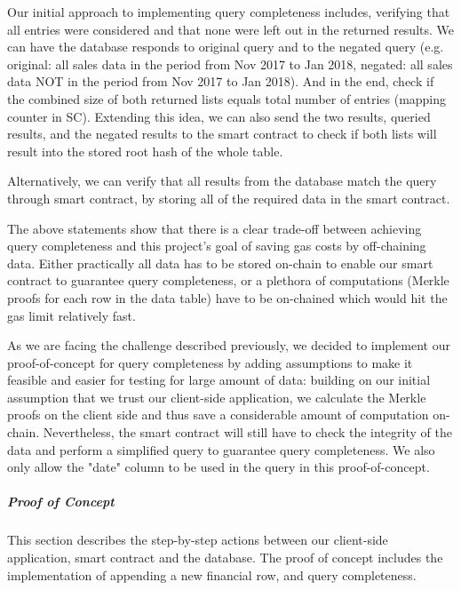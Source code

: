 Our initial approach to implementing query completeness includes, verifying that all entries were considered and that none were left out in the returned results. We can have the database responds to original query and to the negated query (e.g. original: all sales data in the period from Nov 2017 to Jan 2018, negated: all sales data NOT in the period from Nov 2017 to Jan 2018). And in the end, check if the combined size of both returned lists equals total number of entries (mapping counter in SC). Extending this idea, we can also send the two results, queried results, and the negated results to the smart contract to check if both lists will result into the stored root hash of the whole table.

Alternatively, we can verify that all results from the database match the query through smart contract, by storing all of the required data in the smart contract.

The above statements show that there is a clear trade-off between achieving query completeness and this project’s goal of saving gas costs by off-chaining data. Either practically all data has to be stored on-chain to enable our smart contract to guarantee query completeness, or a plethora of computations (Merkle proofs for each row in the data table) have to be on-chained which would hit the gas limit relatively fast.

As we are facing the challenge described previously, we decided to implement our proof-of-concept for query completeness by adding assumptions to make it feasible and easier for testing for large amount of data: building on our initial assumption that we trust our client-side application, we calculate the Merkle proofs on the client side and thus save a considerable amount of computation on-chain. Nevertheless, the smart contract will still have to check the integrity of the data and perform a simplified query to guarantee query completeness. We also only allow the "date" column to be used in the query in this proof-of-concept.

\subparagraph{Proof of Concept}

This section describes the step-by-step actions between our client-side application, smart contract and the database. The proof of concept includes the implementation of appending a new financial row, and query completeness.

